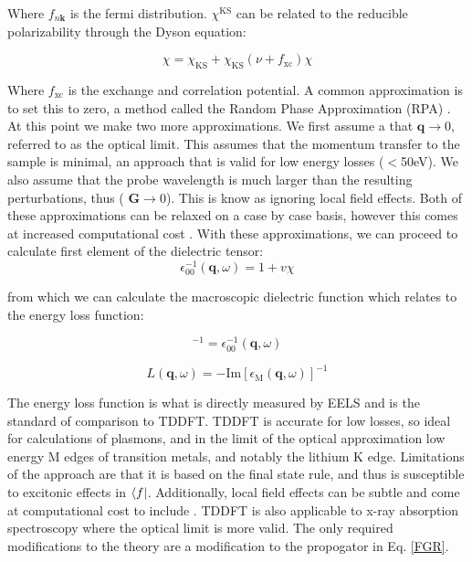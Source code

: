 Where $f_{n\textbf{k}}$ is the fermi distribution.  $\chi^{\mathrm{KS}}$ can be related to the reducible polarizability through the Dyson equation:  

\begin{equation}
\chi = \chi_{\mathrm{KS}} + \chi_{\mathrm{KS}}(\nu + f_{\mathrm{xc}})\chi
\end{equation}

Where $f_{\mathrm{xc}}$ is the exchange and correlation potential.  A common approximation is to set this to zero, a method called the Random Phase Approximation (RPA) \cite{optic}.  At this point we make two more approximations.  We first assume a that $\textbf{q} \to 0$, referred to as the optical limit.  This assumes that the momentum transfer to the sample is minimal, an approach that is valid for low energy losses ($<$50eV).  We also assume that the probe wavelength is much larger than the resulting perturbations, thus ($\textbf{ G} \to 0$). This is know as ignoring local field effects.  Both of these approximations can be relaxed on a case by case basis, however this comes at increased computational cost \cite{exciting}. With these approximations, we can proceed to calculate first element of the dielectric tensor: 
\begin{equation}
\epsilon_{\mathrm{00}}^{-1} (\textbf{q},\omega) =1+v \chi
\end{equation}

from which we can calculate the macroscopic dielectric function which relates to the energy loss function: 

\begin{equation}
[\epsilon_{\mathrm{M}}(\textbf{q}\omega)]^{-1} = \epsilon_{\mathrm{00}}^{-1}(\textbf{q},\omega)
\end{equation}

\begin{equation}
	L(\textbf{q},\omega) = -\mathrm{Im}[\epsilon_{\mathrm{M}}(\textbf{q},\omega)]^{-1}
\end{equation}

The energy loss function is what is directly measured by EELS and is the standard of comparison to TDDFT. TDDFT is accurate for low losses, so ideal for calculations of plasmons, and in the limit of the optical approximation low energy M edges of transition metals, and notably the lithium K edge.  Limitations of the approach are that it is based on the final state rule, and thus is susceptible to excitonic effects in $\bra{f}$.  Additionally, local field effects can be subtle and come at computational cost to include \cite{mauchamp_local_2008}.    TDDFT is also applicable to x-ray absorption spectroscopy where the optical limit is more valid.  The only required modifications to the theory are a modification to the propogator in Eq. \ref{FGR}.




